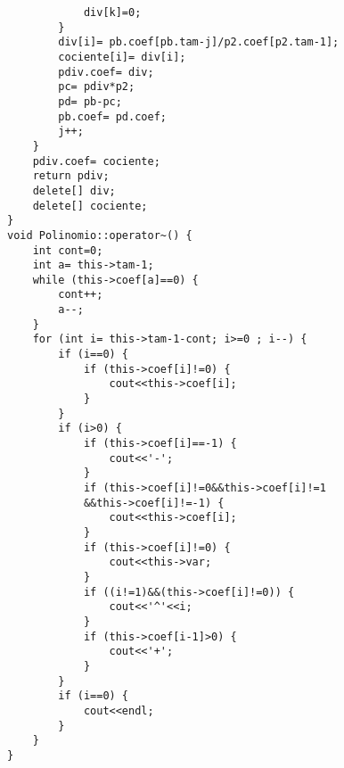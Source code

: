 \documentclass[11pt]{article}
\begin{document}
\begin{lstlisting}
			div[k]=0;
		}
		div[i]= pb.coef[pb.tam-j]/p2.coef[p2.tam-1];
		cociente[i]= div[i];
		pdiv.coef= div;
		pc= pdiv*p2;
		pd= pb-pc;
		pb.coef= pd.coef;
		j++;
	}
	pdiv.coef= cociente;
	return pdiv;
	delete[] div;
	delete[] cociente;
}
void Polinomio::operator~() {
	int cont=0;
	int a= this->tam-1;
	while (this->coef[a]==0) {
		cont++;
		a--;
	}
	for (int i= this->tam-1-cont; i>=0 ; i--) {
		if (i==0) {
			if (this->coef[i]!=0) {
				cout<<this->coef[i];
			}
		}
		if (i>0) {
			if (this->coef[i]==-1) {
				cout<<'-';
			}
			if (this->coef[i]!=0&&this->coef[i]!=1
			&&this->coef[i]!=-1) {
				cout<<this->coef[i];
			}
			if (this->coef[i]!=0) {
				cout<<this->var;
			}
			if ((i!=1)&&(this->coef[i]!=0)) {
				cout<<'^'<<i;
			}
			if (this->coef[i-1]>0) {
				cout<<'+';
			}
		}
		if (i==0) {
			cout<<endl;
		}
	}
}
\end{lstlisting}
\vspace{2 em}
\end{document}

